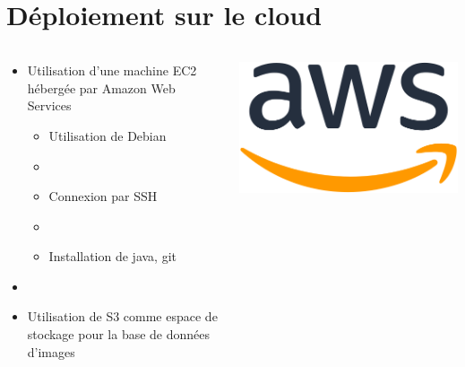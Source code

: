\documentclass[8pt,aspectratio=169,hyperref={unicode=true}]{beamer}
\begin{document}
\section{Déploiement sur le cloud}
\begin{frame}{\insertsection}
  \begin{columns}
    \begin{column}{.6\textwidth}
      \begin{itemize}
        \item Utilisation d'une machine EC2 hébergée par Amazon Web Services
              \begin{itemize}
                \item Utilisation de Debian
                \item[]
                \item Connexion par SSH
                \item[]
                \item Installation de java, git
              \end{itemize}
        \item[]
        \item Utilisation de S3 comme espace de stockage pour la base de données d'images
      \end{itemize}
    \end{column}
    \begin{column}{.4\textwidth}
      \center
      \includegraphics[width=.8\textwidth]{./512px-Amazon_Web_Services_Logo.svg.png}
    \end{column}
  \end{columns}
\end{frame}
\end{document}
